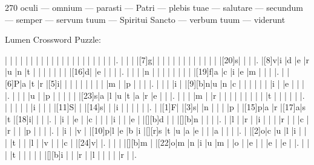 \documentclass[12pt]{article}
\begin{document}
\pagestyle{fancy}
\fancyhf{}
\renewcommand{\headrulewidth}{0pt}
\renewcommand{\footrulewidth}{0pt}
\libertine
\renewcommand\PuzzleClueFont{\rm\normalsize}
\noindent\begin{rotate}{0}
\small
\end{rotate}
\hfill
\begin{rotate}{270}
\small
oculi --- omnium --- parasti --- Patri --- plebis tuae --- salutare --- secundum --- semper --- servum tuum --- Spiritui Sancto --- verbum tuum --- viderunt
\end{rotate}
\begin{center}
  \huge{Lumen Crossword Puzzle:}
\end{center}
\vspace{1.5cm}
\begin{Puzzle}{22}{24}
  |{}  |{}  |{}  |{}  |{}  |{}  |{}  |{}  |{}  |{}  |{}  |{}  |{}  |{}  |{}  |{}  |{}  |{}  |{}  |{}  |{}  |.
  |{}  |{}  |{}  |[7]g|{}  |{}  |{}  |{}  |{}  |{}  |{}  |{}  |{}  |{}  |{}  |{}  |{}  |[20]s|{}  |{}  |{}  |.
  |[8]v|i   |d   |e   |r   |u   |n   |t   |{}  |{}  |{}  |{}  |{}  |{}  |{}  |[16]d|{}  |e   |{}  |{}  |{}  |.
  |{}  |{}  |{}  |n   |{}  |{}  |{}  |{}  |{}  |{}  |{}  |{}  |[19]f|a   |c   |i   |e   |m   |{}  |{}  |{}  |.
  |{}  |[6]P|a   |t   |r   |[5]i|{}  |{}  |{}  |{}  |{}  |{}  |{}  |{}  |{}  |m   |{}  |p   |{}  |{}  |{}  |.
  |{}  |{}  |{}  |i   |{}  |[9][b]n|u   |n   |c   |{}  |{}  |{}  |{}  |{}  |{}  |i   |{}  |e   |{}  |{}  |{}  |.
  |{}  |{}  |{}  |u   |{}  |p   |{}  |{}  |{}  |{}  |{}  |[23]s|a   |l   |u   |t   |a   |r   |e   |{}  |{}  |.
  |{}  |{}  |{}  |m   |{}  |r   |{}  |{}  |{}  |{}  |{}  |{}  |{}  |{}  |{}  |t   |{}  |{}  |{}  |{}  |{}  |.
  |{}  |{}  |{}  |{}  |{}  |i   |{}  |{}  |{}  |[11]S|{}  |{}  |[14]s|{}  |{}  |i   |{}  |{}  |{}  |{}  |{}  |.
  |{}  |[1]F|{}  |[3]s|{}  |n   |{}  |{}  |{}  |p   |{}  |[15]p|a   |r   |[17]a|s   |t   |[18]i|{}  |{}  |{}  |.
  |{}  |i   |{}  |e   |{}  |c   |{}  |{}  |{}  |i   |{}  |{}  |e   |{}  |[][b]d   |{}  |{}  |[][b]n   |{}  |{}  |{}  |.
  |{}  |l   |{}  |r   |{}  |i   |{}  |{}  |{}  |r   |{}  |{}  |c   |{}  |r   |{}  |{}  |p   |{}  |{}  |{}  |.
  |{}  |i   |{}  |v   |{}  |[10]p|l   |e   |b   |i   |[][r]s   |t   |u   |a   |e   |{}  |{}  |a   |{}  |{}  |{}  |.
  |{}  |[2]o|c   |u   |l   |i   |{}  |{}  |{}  |t   |{}  |{}  |l   |{}  |v   |{}  |{}  |c   |{}  |[24]v|{}  |.
  |{}  |{}  |{}  |[][b]m   |{}  |[22]o|m   |n   |i   |u   |m   |{}  |o   |{}  |e   |{}  |{}  |e   |{}  |e   |{}  |.
  |{}  |{}  |{}  |t   |{}  |{}  |{}  |{}  |{}  |[][b]i   |{}  |{}  |r   |{}  |l   |{}  |{}  |{}  |{}  |r   |{}  |.

\end{Puzzle}
\end{document}
